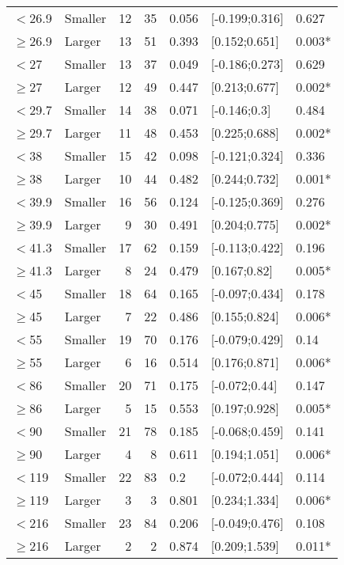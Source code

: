 \documentclass{article}
\begin{document}
\begin{table}[H]
\begin{tabular}{llrrlll}
  $<$26.9 & Smaller & 12 & 35 & 0.056 & [-0.199;0.316] & 0.627 \\ 
  $\ge$26.9 & Larger & 13 & 51 & 0.393 & [0.152;0.651] & 0.003* \\ 
  $<$27 & Smaller & 13 & 37 & 0.049 & [-0.186;0.273] & 0.629 \\ 
  $\ge$27 & Larger & 12 & 49 & 0.447 & [0.213;0.677] & 0.002* \\ 
  $<$29.7 & Smaller & 14 & 38 & 0.071 & [-0.146;0.3] & 0.484 \\ 
  $\ge$29.7 & Larger & 11 & 48 & 0.453 & [0.225;0.688] & 0.002* \\ 
  $<$38 & Smaller & 15 & 42 & 0.098 & [-0.121;0.324] & 0.336 \\ 
  $\ge$38 & Larger & 10 & 44 & 0.482 & [0.244;0.732] & 0.001* \\ 
  $<$39.9 & Smaller & 16 & 56 & 0.124 & [-0.125;0.369] & 0.276 \\ 
  $\ge$39.9 & Larger & 9 & 30 & 0.491 & [0.204;0.775] & 0.002* \\ 
  $<$41.3 & Smaller & 17 & 62 & 0.159 & [-0.113;0.422] & 0.196 \\ 
  $\ge$41.3 & Larger &  8 & 24 & 0.479 & [0.167;0.82] & 0.005* \\ 
  $<$45 & Smaller & 18 & 64 & 0.165 & [-0.097;0.434] & 0.178 \\ 
  $\ge$45 & Larger &  7 & 22 & 0.486 & [0.155;0.824] & 0.006* \\ 
  $<$55 & Smaller & 19 & 70 & 0.176 & [-0.079;0.429] & 0.14 \\ 
  $\ge$55 & Larger &  6 & 16 & 0.514 & [0.176;0.871] & 0.006* \\ 
  $<$86 & Smaller & 20 & 71 & 0.175 & [-0.072;0.44] & 0.147 \\ 
  $\ge$86 & Larger &  5 & 15 & 0.553 & [0.197;0.928] & 0.005* \\ 
  $<$90 & Smaller & 21 & 78 & 0.185 & [-0.068;0.459] & 0.141 \\ 
  $\ge$90 & Larger &  4 & 8 & 0.611 & [0.194;1.051] & 0.006* \\ 
  $<$119 & Smaller & 22 & 83 & 0.2 & [-0.072;0.444] & 0.114 \\ 
  $\ge$119 & Larger &  3 & 3 & 0.801 & [0.234;1.334] & 0.006* \\ 
  $<$216 & Smaller & 23 & 84 & 0.206 & [-0.049;0.476] & 0.108 \\ 
  $\ge$216 & Larger &  2 & 2 & 0.874 & [0.209;1.539] & 0.011* \\ 
  \hline
  \end{tabular}
  \end{table}
  
\end{document}
